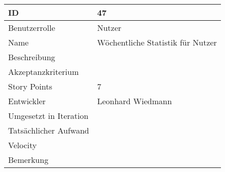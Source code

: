 \begin{tabularx}{\textwidth}{|p{}|X|}
	\hline
	ID & 47\\
	\hline
	Benutzerrolle & Nutzer\\
	\hline
	Name & Wöchentliche Statistik für Nutzer\\
	\hline
	Beschreibung & \\
	\hline
	Akzeptanzkriterium & \\
	\hline
	Story Points & 7\\
	\hline
	Entwickler & Leonhard Wiedmann \\
	\hline
	Umgesetzt in Iteration & \\
	\hline
	Tatsächlicher Aufwand & \\
	\hline
	Velocity & \\
	\hline
	Bemerkung & \\
	\hline
\end{tabularx}
\vspace{20pt}
